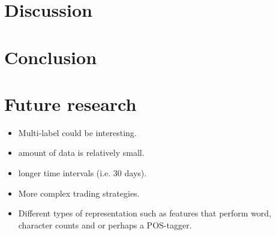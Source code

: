 \documentclass{article}
\begin{document}

\section{Discussion}

\section{Conclusion}

\section{Future research}
\begin{itemize}
    \item Multi-label could be interesting.
    \item amount of data is relatively small.
    \item longer time intervals (i.e. 30 days).
    \item More complex trading strategies.
    \item Different types of representation such as features that perform word, character counts and or perhaps a POS-tagger.
\end{itemize}





\end{document}
